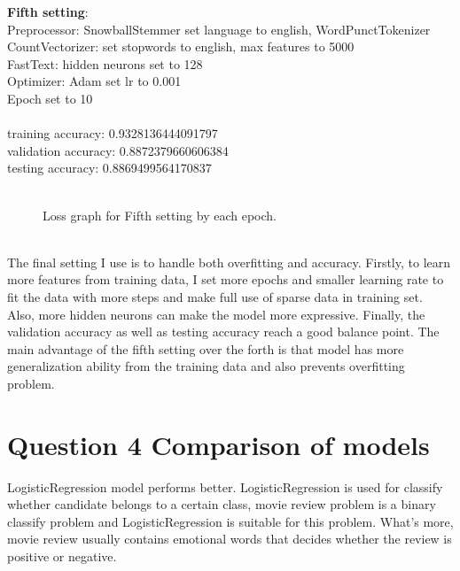 \documentclass{article} %
\begin{document}
\noindent
\textbf{Fifth setting}:\\
Preprocessor: SnowballStemmer set language to english, WordPunctTokenizer\\
CountVectorizer: set stopwords to english, max features to 5000\\
FastText: hidden neurons set to 128\\
Optimizer: Adam set lr to 0.001\\
Epoch set to 10\\
\\
\noindent
training accuracy: 0.9328136444091797\\
validation accuracy: 0.8872379660606384\\
testing accuracy: 0.8869499564170837\\
\begin{figure}[htp]
    \centering
    \\
Loss graph for Fifth setting by each epoch.   
    \end{figure}
    \\
The final setting I use is to handle both overfitting and accuracy. Firstly, to learn more features from training data, I set more epochs and smaller learning rate to fit the data with more steps and make full use of sparse data in training set. Also, more hidden neurons can make the model more expressive. Finally, the validation accuracy as well as testing accuracy reach a good balance point. The main advantage of the fifth setting over the forth is that model has more generalization ability from the training data and also prevents overfitting problem.


\section*{Question 4 Comparison of models}
LogisticRegression model performs better. LogisticRegression is used for classify 
whether candidate belongs to a certain class, movie review problem is a binary 
classify problem and LogisticRegression is suitable for this problem. What's more, movie review usually contains emotional words that  decides whether the review is positive or negative.
\end{document}
